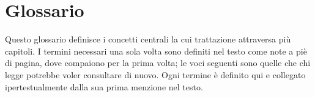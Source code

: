 \chapter*{Glossario}

Questo glossario definisce i concetti centrali la cui trattazione attraversa più capitoli. I termini necessari una sola volta sono definiti nel testo come note a piè di pagina, dove compaiono per la prima volta; le voci seguenti sono quelle che chi legge potrebbe voler consultare di nuovo. Ogni termine è definito qui e collegato ipertestualmente dalla sua prima menzione nel testo.

\printnoidxglossaries
